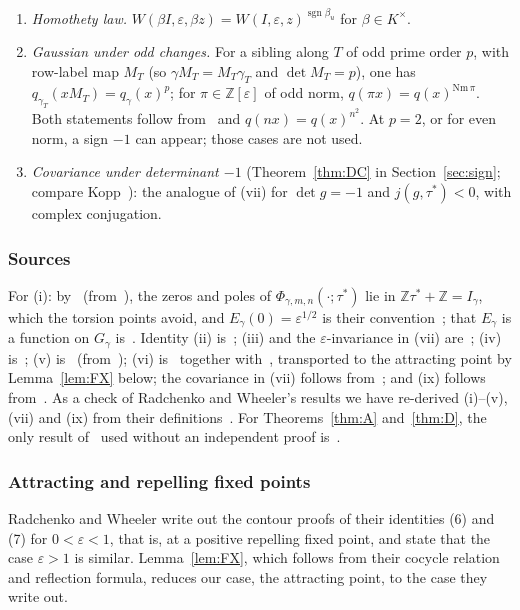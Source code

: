 \documentclass[11pt]{amsart}
\numberwithin{equation}{section}
\theoremstyle{plain}
\theoremstyle{definition}
\theoremstyle{remark}
\begin{document}
\begin{enumerate}
\item[(viii)] \emph{Homothety law.} \(W(\beta I,\varepsilon,\beta z)=W(I,\varepsilon,z)^{\operatorname{sgn}\beta_u}\) for \(\beta\in K^\times\).
\item[(ix)] \emph{Gaussian under odd changes.} For a sibling along \(T\) of odd prime order \(p\), with row-label map \(M_T\) (so \(\gamma M_T=M_T\gamma_T\) and \(\det M_T=p\)), one has \(q_{\gamma_T}(xM_T)=q_\gamma(x)^p\); for \(\pi\in\mathbb Z[\varepsilon]\) of odd norm, \(q(\pi x)=q(x)^{\mathrm{Nm}\,\pi}\). Both statements follow from~\cite[(3)]{RW} and \(q(nx)=q(x)^{n^2}\). At \(p=2\), or for even norm, a sign \(-1\) can appear; those cases are not used.
\item[(x)] \emph{Covariance under determinant \(-1\)} (Theorem~\ref{thm:DC} in Section~\ref{sec:sign}; compare Kopp~\cite[Thm.~4.37]{Ko}): the analogue of (vii) for \(\det g=-1\) and \(j(g,\tau^*)<0\), with complex conjugation.
\end{enumerate}

\subsubsection*{Sources}
For (i): by~\cite[\S2]{RW} (from~\cite[Prop.~2]{RW}), the zeros and poles of \(\Phi_{\gamma,m,n}(\cdot;\tau^*)\) lie in \(\mathbb Z\tau^*+\mathbb Z=I_\gamma\), which the torsion points avoid, and \(E_\gamma(0)=\varepsilon^{1/2}\) is their convention~\cite[(4), (37)]{RW}; that \(E_\gamma\) is a function on \(G_\gamma\) is~\cite[Lemma~2]{RW}. Identity (ii) is~\cite[Prop.~9, (29)]{RW}; (iii) and the \(\varepsilon\)-invariance in (vii) are~\cite[Prop.~8]{RW}; (iv) is~\cite[Prop.~7 and Cor.~1]{RW}; (v) is~\cite[(5)]{RW} (from~\cite[Prop.~1]{RW}); (vi) is~\cite[Thm.~2, (6)]{RW} together with~\cite[(5)]{RW}, transported to the attracting point by Lemma~\ref{lem:FX} below; the covariance in (vii) follows from~\cite[(17)]{RW}; and (ix) follows from~\cite[(3)]{RW}. As a check of Radchenko and Wheeler's results we have re-derived (i)--(v), (vii) and (ix) from their definitions~\cite[(1)--(4)]{RW}. For Theorems~\ref{thm:A} and~\ref{thm:D}, the only result of~\cite{RW} used without an independent proof is~\cite[(6)]{RW}.

\subsubsection*{Attracting and repelling fixed points}
Radchenko and Wheeler write out the contour proofs of their identities (6) and (7) for \(0<\varepsilon<1\), that is, at a positive repelling fixed point, and state that the case \(\varepsilon>1\) is similar. Lemma~\ref{lem:FX}, which follows from their cocycle relation and reflection formula, reduces our case, the attracting point, to the case they write out.
\end{document}
